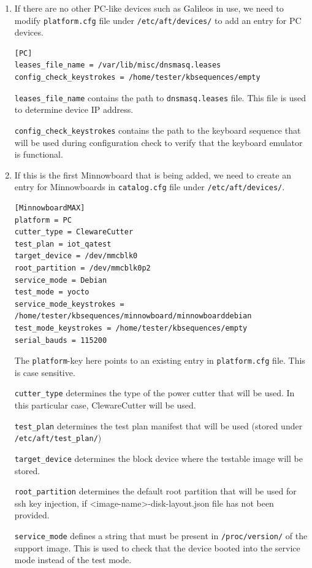 \documentclass[a4paper,11pt]{article}
\newcommand{\cmd}[1]{\texttt{#1}}
\begin{document}
\begin{enumerate}

\item If there are no other PC-like devices such as Galileos in use, we need to modify \cmd{platform.cfg} file under \cmd{/etc/aft/devices/} to add an entry for PC devices.

\begin{lstlisting}
[PC]
leases_file_name = /var/lib/misc/dnsmasq.leases
config_check_keystrokes = /home/tester/kbsequences/empty
\end{lstlisting}

\cmd{leases\_file\_name} contains the path to \cmd{dnsmasq.leases} file. This file is used to determine device IP address.

\cmd{config\_check\_keystrokes} contains the path to the keyboard sequence that will be used during configuration check to verify that the keyboard emulator is functional.

\item If this is the first Minnowboard that is being added, we need to create an entry for Minnowboards in \cmd{catalog.cfg} file under \cmd{/etc/aft/devices/}.

\begin{lstlisting}
[MinnowboardMAX]
platform = PC
cutter_type = ClewareCutter
test_plan = iot_qatest
target_device = /dev/mmcblk0
root_partition = /dev/mmcblk0p2
service_mode = Debian
test_mode = yocto
service_mode_keystrokes = /home/tester/kbsequences/minnowboard/minnowboarddebian
test_mode_keystrokes = /home/tester/kbsequences/empty
serial_bauds = 115200
\end{lstlisting}

The \cmd{platform}-key here points to an existing entry in \cmd{platform.cfg} file. This is case sensitive.

\cmd{cutter\_type} determines the type of the power cutter that will be used. In this particular case, ClewareCutter will be used.

\cmd{test\_plan} determines the test plan manifest that will be used (stored under \cmd{/etc/aft/test\_plan/})

\cmd{target\_device} determines the block device where the testable image will be stored.

\cmd{root\_partition} determines the default root partition that will be used for ssh key injection, if <image-name>-disk-layout.json file has not been provided.

\cmd{service\_mode} defines a string that must be present in \cmd{/proc/version/} of the support image. This is used to check that the device booted into the service mode instead of the test mode.


\end{enumerate}
\end{document}
